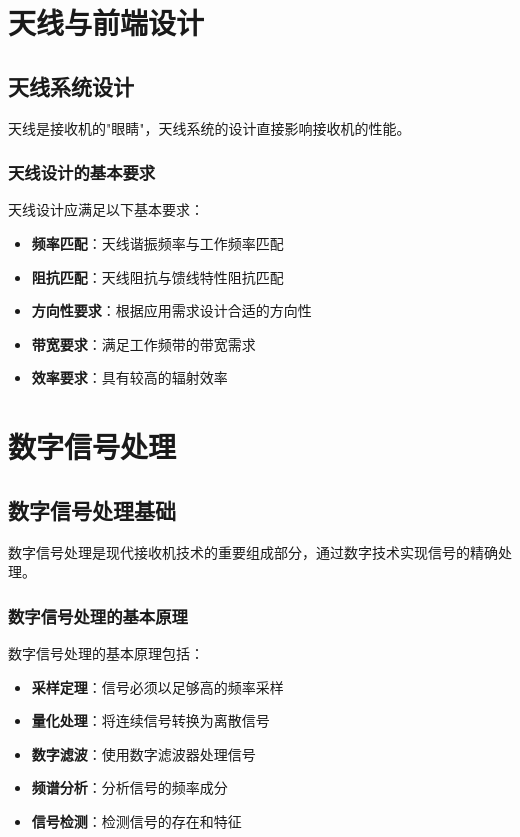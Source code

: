 \documentclass[12pt,UTF8]{ctexbook}
\begin{document}
\chapter{天线与前端设计}

\section{天线系统设计}

天线是接收机的"眼睛"，天线系统的设计直接影响接收机的性能。

\subsection{天线设计的基本要求}

天线设计应满足以下基本要求：

\begin{itemize}[leftmargin=3.5em]
    \item \textbf{频率匹配}：天线谐振频率与工作频率匹配
    \item \textbf{阻抗匹配}：天线阻抗与馈线特性阻抗匹配
    \item \textbf{方向性要求}：根据应用需求设计合适的方向性
    \item \textbf{带宽要求}：满足工作频带的带宽需求
    \item \textbf{效率要求}：具有较高的辐射效率
\end{itemize}

\chapter{数字信号处理}

\section{数字信号处理基础}

数字信号处理是现代接收机技术的重要组成部分，通过数字技术实现信号的精确处理。

\subsection{数字信号处理的基本原理}

数字信号处理的基本原理包括：

\begin{itemize}[leftmargin=3.5em]
    \item \textbf{采样定理}：信号必须以足够高的频率采样
    \item \textbf{量化处理}：将连续信号转换为离散信号
    \item \textbf{数字滤波}：使用数字滤波器处理信号
    \item \textbf{频谱分析}：分析信号的频率成分
    \item \textbf{信号检测}：检测信号的存在和特征
\end{itemize}
\end{document}
